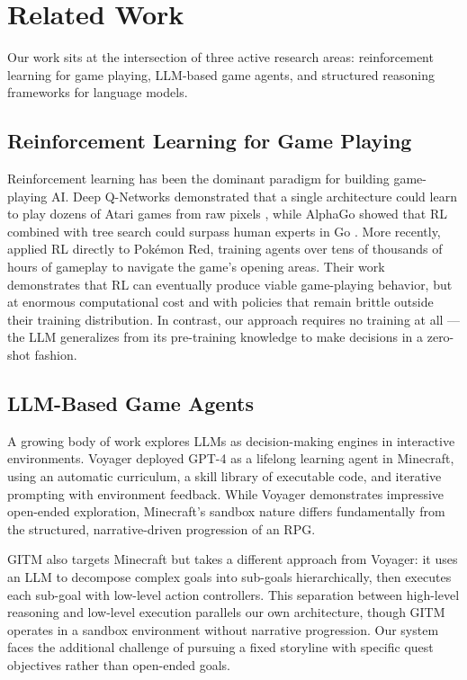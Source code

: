 \documentclass{article}
\begin{document}

\section{Related Work}
\label{sec:related-work}

Our work sits at the intersection of three active research areas: reinforcement learning for game playing, LLM-based game agents, and structured reasoning frameworks for language models.

\subsection{Reinforcement Learning for Game Playing}

Reinforcement learning has been the dominant paradigm for building game-playing AI. Deep Q-Networks demonstrated that a single architecture could learn to play dozens of Atari games from raw pixels \citep{mnih2015human}, while AlphaGo showed that RL combined with tree search could surpass human experts in Go \citep{silver2016mastering}. More recently, \citet{pleines2025pokemon} applied RL directly to Pok\'{e}mon Red, training agents over tens of thousands of hours of gameplay to navigate the game's opening areas. Their work demonstrates that RL can eventually produce viable game-playing behavior, but at enormous computational cost and with policies that remain brittle outside their training distribution. In contrast, our approach requires no training at all --- the LLM generalizes from its pre-training knowledge to make decisions in a zero-shot fashion.

\subsection{LLM-Based Game Agents}

A growing body of work explores LLMs as decision-making engines in interactive environments. Voyager \citep{wang2023voyager} deployed GPT-4 as a lifelong learning agent in Minecraft, using an automatic curriculum, a skill library of executable code, and iterative prompting with environment feedback. While Voyager demonstrates impressive open-ended exploration, Minecraft's sandbox nature differs fundamentally from the structured, narrative-driven progression of an RPG.

GITM \citep{zhu2023gitm} also targets Minecraft but takes a different approach from Voyager: it uses an LLM to decompose complex goals into sub-goals hierarchically, then executes each sub-goal with low-level action controllers. This separation between high-level reasoning and low-level execution parallels our own architecture, though GITM operates in a sandbox environment without narrative progression. Our system faces the additional challenge of pursuing a fixed storyline with specific quest objectives rather than open-ended goals.
\end{document}
